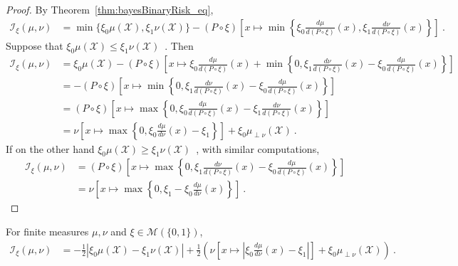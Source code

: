 \begin{proof}\leanok
{}
By Theorem~\ref{thm:bayesBinaryRisk_eq},
\begin{align*}
\mathcal I_\xi(\mu, \nu)
&= \min\{\xi_0\mu(\mathcal X), \xi_1\nu(\mathcal X)\} - (P \circ \xi)\left[x \mapsto \min \left\{\xi_0\frac{d \mu}{d(P \circ \xi)}(x), \xi_1\frac{d \nu}{d(P \circ \xi)}(x)\right\}\right]
\: .
\end{align*}
Suppose that $\xi_0\mu(\mathcal X) \le \xi_1\nu(\mathcal X)$~. Then
\begin{align*}
\mathcal I_\xi(\mu, \nu)
&= \xi_0\mu(\mathcal X) - (P \circ \xi)\left[x \mapsto \xi_0\frac{d \mu}{d(P \circ \xi)}(x) + \min \left\{0 , \xi_1\frac{d \nu}{d(P \circ \xi)}(x) - \xi_0\frac{d \mu}{d(P \circ \xi)}(x)\right\}\right]
\\
&= - (P \circ \xi)\left[x \mapsto \min \left\{0 , \xi_1\frac{d \nu}{d(P \circ \xi)}(x) - \xi_0\frac{d \mu}{d(P \circ \xi)}(x) \right\}\right]
\\
&= (P \circ \xi)\left[x \mapsto \max \left\{0 , \xi_0\frac{d \mu}{d(P \circ \xi)}(x) - \xi_1\frac{d \nu}{d(P \circ \xi)}(x) \right\}\right]
\\
&= \nu\left[ x \mapsto \max \left\{0 , \xi_0\frac{d \mu}{d\nu}(x) - \xi_1 \right\} \right] + \xi_0 \mu_{\perp \nu}(\mathcal X)
\: .
\end{align*}
If on the other hand $\xi_0\mu(\mathcal X) \ge \xi_1\nu(\mathcal X)$~, with similar computations,
\begin{align*}
\mathcal I_\xi(\mu, \nu)
&= (P \circ \xi)\left[x \mapsto \max \left\{0 , \xi_1\frac{d \nu}{d(P \circ \xi)}(x) - \xi_0\frac{d \mu}{d(P \circ \xi)}(x) \right\}\right]
\\
&= \nu\left[ x \mapsto \max \left\{0 , \xi_1 - \xi_0\frac{d \mu}{d\nu}(x) \right\} \right]
\: .
\end{align*}
\end{proof}


\begin{corollary}
  \label{cor:statInfo_eq_integral_abs}
  \leanok
  For finite measures $\mu, \nu$ and $\xi \in \mathcal M(\{0,1\})$,
  \begin{align*}
  \mathcal I_\xi(\mu, \nu)
  &= -\frac{1}{2} \left\vert\xi_0 \mu(\mathcal X) - \xi_1 \nu(\mathcal X)\right\vert + \frac{1}{2}\left( \nu\left[ x \mapsto \left\vert\xi_0\frac{d \mu}{d\nu}(x) - \xi_1 \right\vert \right]  + \xi_0 \mu_{\perp \nu}(\mathcal X)\right)
  \: .
  \end{align*}
\end{corollary}

